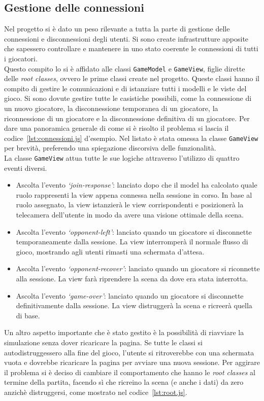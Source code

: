 \subsection{Gestione delle connessioni}
Nel progetto si è dato un peso rilevante a tutta la parte di gestione delle connessioni e disconnessioni degli utenti. Si sono create infrastrutture apposite che sapessero controllare
e mantenere in uno stato coerente le connessioni di tutti i giocatori.\\
Questo compito lo si è affidato alle classi \texttt{GameModel} e \texttt{GameView}, figlie dirette delle \textit{root classes}, ovvero le prime classi create nel progetto.
Queste classi hanno il compito di gestire le comunicazioni e di istanziare tutti i modelli e le viste del gioco. Si sono dovute gestire tutte le casistiche possibili, come la 
connessione di un nuovo giocatore, la disconnessione temporanea di un giocatore, la riconnessione di un giocatore e la disconnessione definitiva di un giocatore. 
Per dare una panoramica generale di come si è risolto il problema si lascia il codice~\ref{lst:connessioni.js} d'esempio. Nel listato è stata omessa la classe \texttt{GameView} per 
brevità, preferendo una spiegazione discorsiva delle funzionalità.\\
La classe \texttt{GameView} attua tutte le sue logiche attraverso l'utilizzo di quattro eventi diversi.
\begin{itemize}
    \item Ascolta l'evento \textit{`join-response'}: lanciato dopo che il model ha calcolato quale ruolo rappresenti la view appena connessa nella sessione in corso. In base al ruolo
    assegnato, la view istanzierà le view corrispondenti e posizionerà la telecamera dell'utente in modo da avere una visione ottimale della scena.
    \item Ascolta l'evento \textit{`opponent-left'}: lanciato quando un giocatore si disconnette temporaneamente dalla sessione. La view interromperà il normale flusso di gioco, 
    mostrando agli utenti rimasti una schermata d'attesa.
    \item Ascolta l'evento \textit{`opponent-recover'}: lanciato quando un giocatore si riconnette alla sessione. La view farà riprendere la scena da dove era stata interrotta.
    \item Ascolta l'evento \textit{`game-over'}: lanciato quando un giocatore si disconnette definitivamente dalla sessione. La view distruggerà la scena e ricreerà quella di base.
\end{itemize}
Un altro aspetto importante che è stato gestito è la possibilità di riavviare la simulazione senza dover ricaricare la pagina. Se tutte le classi si autodistruggessero alla fine del
gioco, l'utente si ritroverebbe con una schermata vuota e dovrebbe ricaricare la pagina per avviare una nuova sessione. Per aggirare il problema si è deciso di cambiare il 
comportamento che hanno le \textit{root classes} al termine della partita, facendo sì che ricreino la scena (e anche i dati) da zero anzichè distruggersi, come mostrato nel 
codice~\ref{lst:root.js}.

